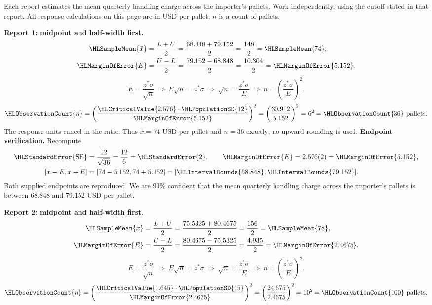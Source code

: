 Each report estimates the mean quarterly handling charge across the importer's pallets. Work independently, using the cutoff stated in that report. All response calculations on this page are in USD per pallet; $n$ is a count of pallets.
\par\noindent\textbf{Report 1: midpoint and half-width first.}
\[\begin{aligned}
\HLSampleMean{\bar x}&=\frac{L+U}{2}=\frac{68.848+79.152}{2}=\frac{148}{2}=\HLSampleMean{74},\\
\HLMarginOfError{E}&=\frac{U-L}{2}=\frac{79.152-68.848}{2}=\frac{10.304}{2}=\HLMarginOfError{5.152}.
\end{aligned}\]
\[E=\frac{z^*\sigma}{\sqrt n}\ \Longrightarrow\ E\sqrt n=z^*\sigma\ \Longrightarrow\ \sqrt n=\frac{z^*\sigma}{E}\ \Longrightarrow\ n=\left(\frac{z^*\sigma}{E}\right)^2.\]
\[\HLObservationCount{n}=\left(\frac{\HLCriticalValue{2.576}\cdot\HLPopulationSD{12}}{\HLMarginOfError{5.152}}\right)^2=\left(\frac{30.912}{5.152}\right)^2=6^2=\HLObservationCount{36}\text{ pallets}.\]
The response units cancel in the ratio. Thus $\bar x=74$ USD per pallet and $n=36$ exactly; no upward rounding is used.
\textbf{Endpoint verification.} Recompute
\[\begin{aligned}
\HLStandardError{\mathrm{SE}}&=\frac{12}{\sqrt{36}}=\frac{12}{6}=\HLStandardError{2},\qquad \HLMarginOfError{E}=2.576(2)=\HLMarginOfError{5.152},\\
[\bar x-E,\bar x+E]&=[74-5.152,74+5.152]=[\HLIntervalBounds{68.848},\HLIntervalBounds{79.152}].
\end{aligned}\]
Both supplied endpoints are reproduced. We are 99\% confident that the mean quarterly handling charge across the importer's pallets is between 68.848 and 79.152 USD per pallet.
\par\noindent\textbf{Report 2: midpoint and half-width first.}
\[\begin{aligned}
\HLSampleMean{\bar x}&=\frac{L+U}{2}=\frac{75.5325+80.4675}{2}=\frac{156}{2}=\HLSampleMean{78},\\
\HLMarginOfError{E}&=\frac{U-L}{2}=\frac{80.4675-75.5325}{2}=\frac{4.935}{2}=\HLMarginOfError{2.4675}.
\end{aligned}\]
\[E=\frac{z^*\sigma}{\sqrt n}\ \Longrightarrow\ E\sqrt n=z^*\sigma\ \Longrightarrow\ \sqrt n=\frac{z^*\sigma}{E}\ \Longrightarrow\ n=\left(\frac{z^*\sigma}{E}\right)^2.\]
\[\HLObservationCount{n}=\left(\frac{\HLCriticalValue{1.645}\cdot\HLPopulationSD{15}}{\HLMarginOfError{2.4675}}\right)^2=\left(\frac{24.675}{2.4675}\right)^2=10^2=\HLObservationCount{100}\text{ pallets}.\]
